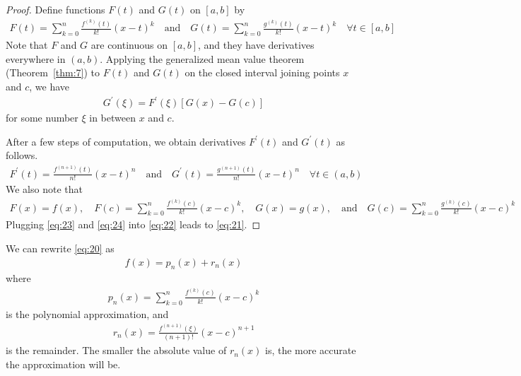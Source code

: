 \documentclass[thmcnt=section, 12pt]{my-elegantbook}
\begin{document}
\begin{proof}
    Define functions $F(t)$ and $G(t)$ on $[a, b]$ by 
    \begin{align*}
        F(t) = \sum_{k=0}^{n} \frac{f^{(k)}(t)}{k!}(x-t)^k
        \quad \text{and} \quad 
        G(t) = \sum_{k=0}^{n} \frac{g^{(k)}(t)}{k!}(x-t)^k
        \quad \forall t \in [a, b]
    \end{align*}
    Note that $F$ and $G$ are continuous on $[a, b]$, and they have derivatives everywhere in $(a, b)$. Applying the generalized mean value theorem (Theorem~\ref{thm:7}) to $F(t)$ and $G(t)$ on the closed interval joining points $x$ and $c$, we have 
    \begin{align}
        [F(x) - F(c)] G^\prime(\xi)
        = F^\prime(\xi) [G(x) - G(c)]
        \label{eq:22}
    \end{align}
    for some number $\xi$ in between $x$ and $c$.

    \par After a few steps of computation, we obtain derivatives $F^\prime(t)$ and $G^\prime(t)$ as follows.
    \begin{align}
        F^\prime(t) = \frac{f^{(n+1)}(t)}{n!}(x-t)^{n}
        \quad \text{and} \quad 
        G^\prime(t) = \frac{g^{(n+1)}(t)}{n!}(x-t)^{n}
        \quad \forall t \in (a, b)
        \label{eq:23}
    \end{align}
    We also note that 
    \begin{align}
        F(x) = f(x), 
        \quad
        F(c) = \sum_{k=0}^{n} \frac{f^{(k)}(c)}{k!}(x-c)^k, 
        \quad
        G(x) = g(x), 
        \quad \text{and} \quad
        G(c) = \sum_{k=0}^{n} \frac{g^{(k)}(c)}{k!}(x-c)^k
        \label{eq:24}
    \end{align}
    Plugging \eqref{eq:23} and \eqref{eq:24} into \eqref{eq:22} leads to \eqref{eq:21}.
\end{proof}

\par We can rewrite \eqref{eq:20} as 
\begin{align*}
    f(x) = p_n(x) + r_n(x)
\end{align*}
where 
\begin{align*}
    p_n(x) = \sum_{k=0}^{n} \frac{f^{(k)}(c)}{k!}(x-c)^k
\end{align*}
is the polynomial approximation, and 
\begin{align*}
    r_n(x) = \frac{f^{(n+1)}(\xi)}{(n+1)!} (x-c)^{n+1}
\end{align*}
is the remainder. The smaller the absolute value of $r_n(x)$ is, the more accurate the approximation will be.
\end{document}
